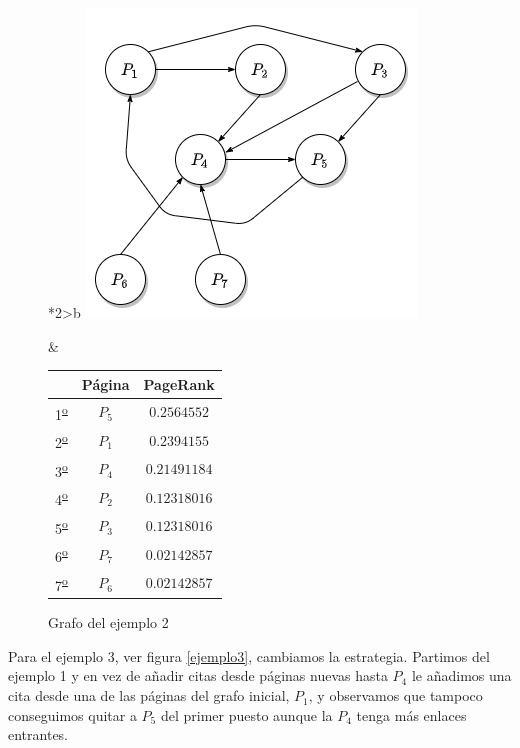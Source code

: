 \documentclass[size=a4, parskip=half, titlepage=false, toc=flat, toc=bib, 12pt, twoside]{scrartcl}
\theoremstyle{theorem-style}
\theoremstyle{definition-style}
\theoremstyle{remark-style}
\theoremstyle{example-style}
\theoremstyle{definition-style}
\theoremstyle{remark-style}
\begin{document}
\begin{figure}[!ht]
  \begin{tabular}{*{2}{>{\centering\arraybackslash}b{}}}
  \centering
    \includegraphics[scale=0.5]{./img/grafoej2}
    \caption{Grafo del ejemplo 2}
    \label{ejemplo2}
    &
      \renewcommand{\arraystretch}{1.3}
      \begin{tabular}{ccc}
        & Página & PageRank     \\ \hline
      1\textsuperscript{\underline{o}}} & $P_5$  & $0.2564552$  \\ \hline
      2\textsuperscript{\underline{o}}} & $P_1$  & $0.2394155$  \\ \hline
      3\textsuperscript{\underline{o}}} & $P_4$  & $0.21491184$ \\ \hline
      4\textsuperscript{\underline{o}}} & $P_2$  & $0.12318016$ \\ \hline
      5\textsuperscript{\underline{o}}} & $P_3$  & $0.12318016$ \\ \hline
      6\textsuperscript{\underline{o}}} & $P_7$  & $0.02142857$ \\ \hline
      7\textsuperscript{\underline{o}}} & $P_6$  & $0.02142857$ \\ \hline
      \end{tabular}\label{tablaejemplo2}
    \end{tabular}
\end{figure}

\newpage

Para el ejemplo 3, ver figura \ref{ejemplo3}, cambiamos la estrategia. Partimos del ejemplo 1 y en vez de añadir citas desde páginas nuevas hasta $P_4$ le añadimos una cita desde una de las páginas del grafo inicial, $P_1$, y observamos que tampoco conseguimos quitar a $P_5$ del primer puesto aunque la $P_4$ tenga más enlaces entrantes.
\end{document}
